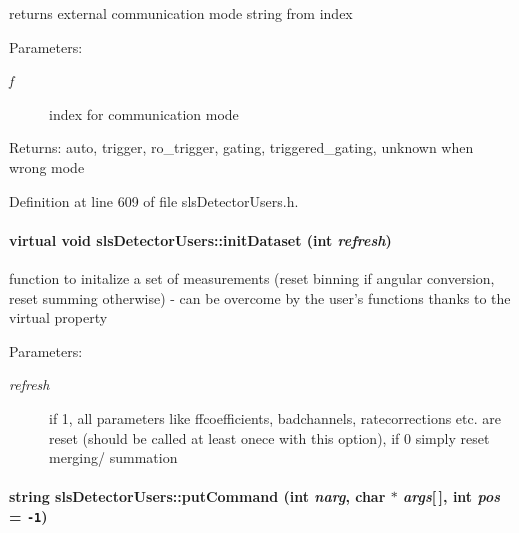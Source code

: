 returns external communication mode string from index 

\begin{Desc}
\item[Parameters:]
\begin{description}
\item[{\em f}]index for communication mode \end{description}
\end{Desc}
\begin{Desc}
\item[Returns:]auto, trigger, ro\_\-trigger, gating, triggered\_\-gating, unknown when wrong mode \end{Desc}


Definition at line 609 of file sls\-Detector\-Users.h.\hypertarget{classslsDetectorUsers_56fa8890298a01fc58baad413dfdf1c1}{
\paragraph[initDataset]{\setlength{\rightskip}{0pt plus 5cm}virtual void sls\-Detector\-Users::init\-Dataset (int {\em refresh})}\hfill}
\label{classslsDetectorUsers_56fa8890298a01fc58baad413dfdf1c1}


function to initalize a set of measurements (reset binning if angular conversion, reset summing otherwise) - can be overcome by the user's functions thanks to the virtual property 

\begin{Desc}
\item[Parameters:]
\begin{description}
\item[{\em refresh}]if 1, all parameters like ffcoefficients, badchannels, ratecorrections etc. are reset (should be called at least onece with this option), if 0 simply reset merging/ summation \end{description}
\end{Desc}
\hypertarget{classslsDetectorUsers_5f7c26833decef59c1abfd7d745c4671}{
\paragraph[putCommand]{\setlength{\rightskip}{0pt plus 5cm}string sls\-Detector\-Users::put\-Command (int {\em narg}, char $\ast$ {\em args}\mbox{[}$\,$\mbox{]}, int {\em pos} = {\tt -1})}\hfill}
\label{classslsDetectorUsers_5f7c26833decef59c1abfd7d745c4671}


